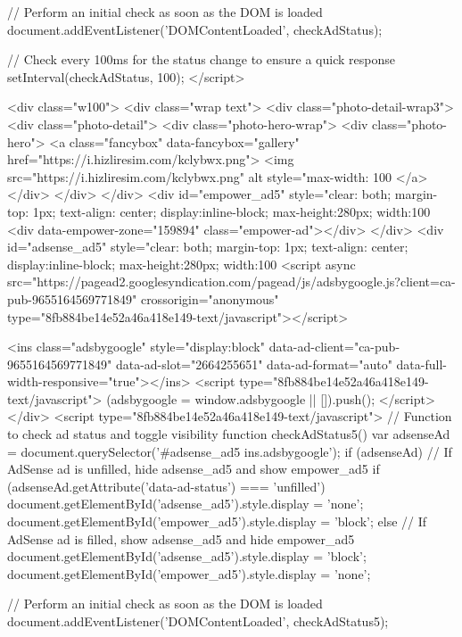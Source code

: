    // Perform an initial check as soon as the DOM is loaded
    document.addEventListener('DOMContentLoaded', checkAdStatus);

    // Check every 100ms for the status change to ensure a quick response
    setInterval(checkAdStatus, 100);
</script>

<div class="w100">
<div class="wrap text">
<div class="photo-detail-wrap3">
<div class="photo-detail">
<div class="photo-hero-wrap">
<div class="photo-hero">
<a class="fancybox" data-fancybox="gallery" href="https://i.hizliresim.com/kclybwx.png">
<img src="https://i.hizliresim.com/kclybwx.png" alt style="max-width: 100%
</a>
</div>
</div>
</div>
<div id="empower_ad5" style="clear: both; margin-top: 1px; text-align: center; display:inline-block; max-height:280px; width:100%
<div data-empower-zone="159894" class="empower-ad"></div>
</div>
<div id="adsense_ad5" style="clear: both; margin-top: 1px; text-align: center; display:inline-block; max-height:280px; width:100%
<script async src="https://pagead2.googlesyndication.com/pagead/js/adsbygoogle.js?client=ca-pub-9655164569771849" crossorigin="anonymous" type="8fb884be14e52a46a418e149-text/javascript"></script>

<ins class="adsbygoogle" style="display:block" data-ad-client="ca-pub-9655164569771849" data-ad-slot="2664255651" data-ad-format="auto" data-full-width-responsive="true"></ins>
<script type="8fb884be14e52a46a418e149-text/javascript">
     (adsbygoogle = window.adsbygoogle || []).push({});
</script>
</div>
<script type="8fb884be14e52a46a418e149-text/javascript">
    // Function to check ad status and toggle visibility
    function checkAdStatus5() {
        var adsenseAd = document.querySelector('#adsense_ad5 ins.adsbygoogle');
        if (adsenseAd) {
            // If AdSense ad is unfilled, hide adsense_ad5 and show empower_ad5
            if (adsenseAd.getAttribute('data-ad-status') === 'unfilled') {
                document.getElementById('adsense_ad5').style.display = 'none';
                document.getElementById('empower_ad5').style.display = 'block';
            } else {
                // If AdSense ad is filled, show adsense_ad5 and hide empower_ad5
                document.getElementById('adsense_ad5').style.display = 'block';
                document.getElementById('empower_ad5').style.display = 'none';
            }
        }
    }

    // Perform an initial check as soon as the DOM is loaded
    document.addEventListener('DOMContentLoaded', checkAdStatus5);

